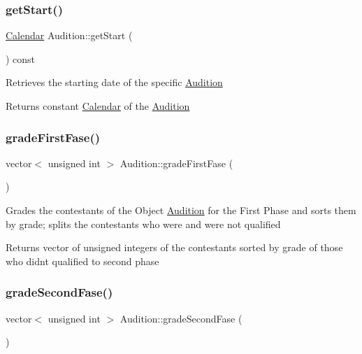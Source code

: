 \subsubsection{\texorpdfstring{get\+Start()}{getStart()}}
{\footnotesize\ttfamily \hyperlink{class_calendar}{Calendar} Audition\+::get\+Start (\begin{DoxyParamCaption}{ }\end{DoxyParamCaption}) const}

Retrieves the starting date of the specific \hyperlink{class_audition}{Audition} \begin{DoxyReturn}{Returns}
constant \hyperlink{class_calendar}{Calendar} of the \hyperlink{class_audition}{Audition} 
\end{DoxyReturn}
\mbox{\label{class_audition_a5fb1b67448d24aa4f854836470c5c83d}} 
\subsubsection{\texorpdfstring{grade\+First\+Fase()}{gradeFirstFase()}}
{\footnotesize\ttfamily vector$<$ unsigned int $>$ Audition\+::grade\+First\+Fase (\begin{DoxyParamCaption}{ }\end{DoxyParamCaption})}

Grades the contestants of the Object \hyperlink{class_audition}{Audition} for the First Phase and sorts them by grade; splits the contestants who were and were not qualified \begin{DoxyReturn}{Returns}
vector of unsigned integers of the contestants sorted by grade of those who didn\textquotesingle{}t qualified to second phase 
\end{DoxyReturn}
\mbox{\label{class_audition_a0d7322e61cd758dc9b29d77a6d55de70}} 
\subsubsection{\texorpdfstring{grade\+Second\+Fase()}{gradeSecondFase()}}
{\footnotesize\ttfamily vector$<$ unsigned int $>$ Audition\+::grade\+Second\+Fase (\begin{DoxyParamCaption}{ }\end{DoxyParamCaption})}

